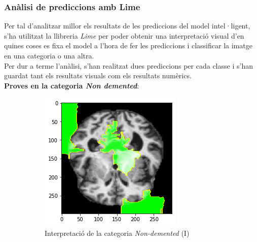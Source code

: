\documentclass[a4paper,12pt]{article}
\begin{document}
\subsubsection*{Anàlisi de prediccions amb Lime}
Per tal d'analitzar millor els resultats de les prediccions del model intel·ligent, s'ha utilitzat la llibreria \textit{Lime} per poder obtenir una interpretació visual d'en quines coses es fixa el model a l'hora de fer les prediccions i classificar la imatge en una categoria o una altra.\\
Per dur a terme l'anàlisi, s'han realitzat dues prediccions per cada classe i s'han guardat tant els resultats visuals com els resultats numèrics.\\
\textbf{Proves en la categoria \textit{Non demented}}:
\begin{figure}[h!]
    \centering
    \begin{subfigure}[b]{0.40\linewidth}
        \includegraphics[width=\linewidth]{images/Non-demented.png}
        \caption{Interpretació de la categoria \textit{Non-demented} (I)}
        \label{fig:ND1}
    \end{subfigure}
    \begin{subfigure}[b]{0.40\linewidth}

\end{subfigure}
\end{figure}
\end{document}
